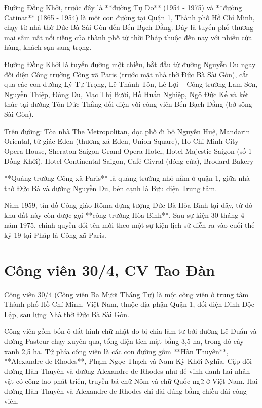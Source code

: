 Đường Đồng Khởi, trước đây là **đường Tự Do** (1954 - 1975) và **đường Catinat** (1865 - 1954) là một con đường tại Quận 1, Thành phố Hồ Chí Minh, chạy từ nhà thờ Đức Bà Sài Gòn đến Bến Bạch Đằng. Đây là tuyến phố thương mại sầm uất nổi tiếng của thành phố từ thời Pháp thuộc đến nay với nhiều cửa hàng, khách sạn sang trọng.

Đường Đồng Khởi là tuyến đường một chiều, bắt đầu từ đường Nguyễn Du ngay đối diện Công trường Công xã Paris (trước mặt nhà thờ Đức Bà Sài Gòn), cắt qua các con đường Lý Tự Trọng, Lê Thánh Tôn, Lê Lợi – Công trường Lam Sơn, Nguyễn Thiệp, Đông Du, Mạc Thị Bưởi, Hồ Huấn Nghiệp, Ngô Đức Kế và kết thúc tại đường Tôn Đức Thắng đối diện với công viên Bến Bạch Đằng (bờ sông Sài Gòn).

Trên đường: Tòa nhà The Metropolitan, dọc phố đi bộ Nguyễn Huệ, Mandarin Oriental, tứ giác Eden (thương xá Eden, Union Square), Ho Chi Minh City Opera House, Sheraton Saigon Grand Opera Hotel, Hotel Majestic Saigon (số 1 Đồng Khởi), Hotel Continental Saigon, Café Givral (đóng cửa), Brodard Bakery

**Quảng trường Công xã Paris** là quảng trường nhỏ nằm ở quận 1, giữa nhà thờ Đức Bà và đường Nguyễn Du, bên cạnh là Bưu điện Trung tâm.

Năm 1959, tín đồ Công giáo Rôma dựng tượng Đức Bà Hòa Bình tại đây, từ đó khu đất này còn được gọi **công trường Hòa Bình**. Sau sự kiện 30 tháng 4 năm 1975, chính quyền đổi tên mới theo một sự kiện lịch sử diễn ra vào cuối thế kỷ 19 tại Pháp là Công xã Paris.

\section{Công viên 30/4, CV Tao Đàn}

Công viên 30/4 (Công viên Ba Mươi Tháng Tư) là một công viên ở trung tâm Thành phố Hồ Chí Minh, Việt Nam, thuộc địa phận Quận 1, đối diện Dinh Độc Lập, sau lưng Nhà thờ Đức Bà Sài Gòn.

Công viên gồm bốn ô đất hình chữ nhật do bị chia làm tư bởi đường Lê Duẩn và đường Pasteur chạy xuyên qua, tổng diện tích mặt bằng 3,5 ha, trong đó cây xanh 2,5 ha. Tứ phía công viên là các con đường gồm **Hàn Thuyên**, **Alexandre de Rhodes**, Phạm Ngọc Thạch và Nam Kỳ Khởi Nghĩa. Cặp đôi đường Hàn Thuyên và đường Alexandre de Rhodes như để vinh danh hai nhân vật có công lao phát triển, truyền bá chữ Nôm và chữ Quốc ngữ ở Việt Nam. Hai đường Hàn Thuyên và Alexandre de Rhodes chỉ dài đúng bằng chiều dài công viên.

